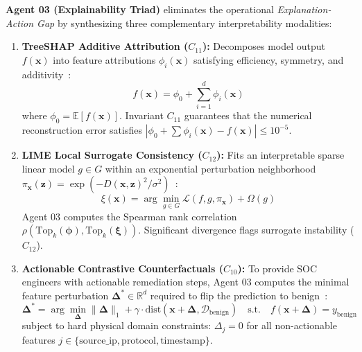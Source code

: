 \documentclass{ieeeaccess}
\begin{document}
\textbf{Agent 03 (Explainability Triad)} eliminates the operational \textit{Explanation-Action Gap} by synthesizing three complementary interpretability modalities:
\begin{enumerate}
    \item \textbf{TreeSHAP Additive Attribution ($C_{11}$):} Decomposes model output $f(\mathbf{x})$ into feature attributions $\phi_i(\mathbf{x})$ satisfying efficiency, symmetry, and additivity~\cite{lundberg2017unified}:
    \begin{equation}
    f(\mathbf{x}) = \phi_0 + \sum_{i=1}^d \phi_i(\mathbf{x})
    \end{equation}
    where $\phi_0 = \mathbb{E}[f(\mathbf{x})]$. Invariant $C_{11}$ guarantees that the numerical reconstruction error satisfies $|\phi_0 + \sum \phi_i(\mathbf{x}) - f(\mathbf{x})| \le 10^{-5}$.
    \item \textbf{LIME Local Surrogate Consistency ($C_{12}$):} Fits an interpretable sparse linear model $g \in G$ within an exponential perturbation neighborhood $\pi_{\mathbf{x}}(\mathbf{z}) = \exp(-D(\mathbf{x}, \mathbf{z})^2 / \sigma^2)$~\cite{ribeiro2016should}:
    \begin{equation}
    \xi(\mathbf{x}) = \arg\min_{g \in G} \mathcal{L}(f, g, \pi_{\mathbf{x}}) + \Omega(g)
    \end{equation}
    Agent 03 computes the Spearman rank correlation $\rho(\text{Top}_k(\boldsymbol{\phi}), \text{Top}_k(\boldsymbol{\xi}))$. Significant divergence flags surrogate instability ($C_{12}$).
    \item \textbf{Actionable Contrastive Counterfactuals ($C_{10}$):} To provide SOC engineers with actionable remediation steps, Agent 03 computes the minimal feature perturbation $\boldsymbol{\Delta}^* \in \mathbb{R}^d$ required to flip the prediction to benign~\cite{wachter2017counterfactual, mothilal2020explaining}:
    \begin{equation}
    \boldsymbol{\Delta}^* = \arg\min_{\boldsymbol{\Delta}} \|\boldsymbol{\Delta}\|_1 + \gamma \cdot \text{dist}(\mathbf{x} + \boldsymbol{\Delta}, \mathcal{D}_{\text{benign}}) \quad \text{s.t.} \quad f(\mathbf{x} + \boldsymbol{\Delta}) = y_{\text{benign}}
    \end{equation}
    subject to hard physical domain constraints: $\Delta_j = 0$ for all non-actionable features $j \in \{\text{source\_ip}, \text{protocol}, \text{timestamp}\}$.
\end{enumerate}
\end{document}
